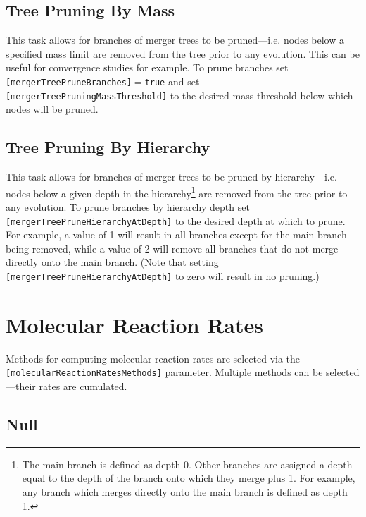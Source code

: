 \subsection{Tree Pruning By Mass}

This task allows for branches of merger trees to be pruned---i.e. nodes below a specified mass limit are removed from the tree prior to any evolution. This can be useful for convergence studies for example. To prune branches set {\tt [mergerTreePruneBranches]}$=${\tt true} and set {\tt [mergerTreePruningMassThreshold]} to the desired mass threshold below which nodes will be pruned.

\subsection{Tree Pruning By Hierarchy}

This task allows for branches of merger trees to be pruned by hierarchy---i.e. nodes below a given depth in the hierarchy\footnote{The main branch is defined as depth 0. Other branches are assigned a depth equal to the depth of the branch onto which they merge plus 1. For example, any branch which merges directly onto the main branch is defined as depth 1.} are removed from the tree prior to any evolution.  To prune branches by hierarchy depth set {\tt [mergerTreePruneHierarchyAtDepth]} to the desired depth at which to prune. For example, a value of 1 will result in all branches except for the main branch being removed, while a value of 2 will remove all branches that do not merge directly onto the main branch. (Note that setting {\tt [mergerTreePruneHierarchyAtDepth]} to zero will result in no pruning.)

\section{Molecular Reaction Rates}\label{sec:MolecularReactionRates}

Methods for computing molecular reaction rates are selected via the {\tt [molecularReactionRatesMethods]} parameter. Multiple methods can be selected---their rates are cumulated.

\subsection{Null}

